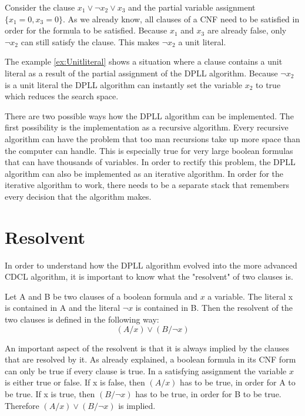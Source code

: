 \begin{leftbar}
\label{ex:Unitliteral}
Consider the clause $x_1 \vee \neg x_2 \vee x_3$ and the partial variable assignment $\{x_1=0,x_3=0\}$. As we already know, all clauses of a CNF need to be satisfied in order for the formula to be satisfied. Because $x_1$ and $x_3$ are already false, only $\neg x_2$ can still satisfy the clause. This makes $\neg x_2$ a unit literal.
\end{leftbar}
The example \ref{ex:Unitliteral} shows a situation where a clause contains a unit literal as a result of the partial assignment of the DPLL algorithm. Because $\neg x_2$ is a unit literal the DPLL algorithm can instantly set the variable $x_2$ to true which reduces the search space.

There are two possible ways how the DPLL algorithm can be implemented. The first possibility is the implementation as a recursive algorithm. Every recursive algorithm can have the problem that too man recursions take up more space than the computer can handle. This is especially true for very large boolean formulas that can have thousands of variables. In order to rectify this problem, the DPLL algorithm can also be implemented as an iterative algorithm. In order for the iterative algorithm to work, there needs to be a separate stack that remembers every decision that the algorithm makes.

\section{Resolvent}
In order to understand how the DPLL algorithm evolved into the more advanced CDCL algorithm, it is important to know what the "resolvent" of two clauses is.

\begin{leftbar}
Let A and B be two clauses of a boolean formula and $x$ a variable. The literal x is contained in A and the literal $\neg x$ is contained in B. Then the resolvent of the two clauses is defined in the following way:
\begin{displaymath}
(A / x) \vee (B / \neg x)
\end{displaymath}
\end{leftbar}
An important aspect of the resolvent is that it is always implied by the clauses that are resolved by it. As already explained, a boolean formula in its CNF form can only be true if every clause is true. In a satisfying assignment the variable $x$ is either true or false. If x is false, then $(A / x)$ has to be true, in order for A to be true. If x is true, then $(B / \neg x)$ has to be true, in order for B to be true. Therefore $(A / x) \vee (B / \neg x)$ is implied.

